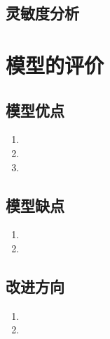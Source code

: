\documentclass[withoutpreface,bwprint]{cumcmthesis} %
\begin{document}
\subsection{灵敏度分析}


\section{模型的评价}
\subsection{模型优点}
\begin{enumerate}
    \item 
    \item 
    \item 
\end{enumerate}

\subsection{模型缺点}
\begin{enumerate}
    \item 
    \item 
\end{enumerate}

\subsection{改进方向}
\begin{enumerate}
    \item 
    \item 
\end{enumerate}


\end{document}
